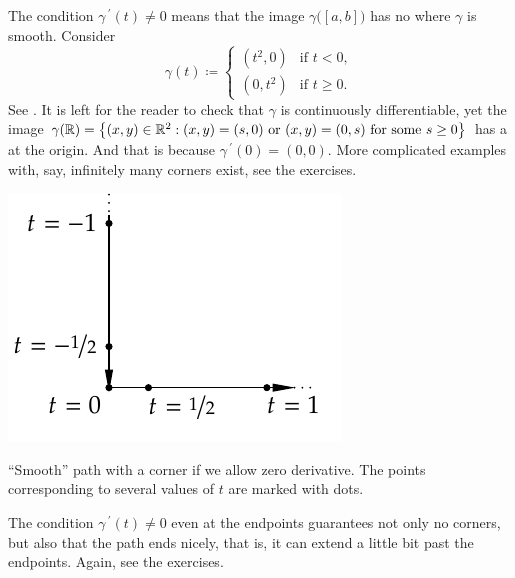 \begin{example}
The condition $\gamma^{\:\prime}(t) \not= 0$ means that the image
$\gamma\bigl([a,b]\bigr)$
has no  where $\gamma$ is smooth.
Consider 
\begin{equation*}
\gamma(t) \coloneqq
\begin{cases}
(t^2,0) & \text{if } t < 0,\\
(0,t^2) & \text{if } t \geq 0.
\end{cases}
\end{equation*}
See .
It is left for the reader to check that $\gamma$ is continuously
differentiable, yet the image $\gamma({\mathbb{R}}) = \bigl\{ (x,y) \in {\mathbb{R}}^2 : (x,y) =
(s,0) \text{ or } (x,y) = (0,s) \text{ for some } s \geq 0 \bigr\}$ has a
 at the origin.  And that is because $\gamma^{\:\prime}(0) = (0,0)$.
More complicated examples with, say, infinitely many corners exist,
see the exercises.
\begin{myfigureht}
\includegraphics{figures/cornersmoothpath}
\caption{``Smooth'' path with a corner if we allow zero derivative.  The
points corresponding to several values of
$t$ are marked with dots.\label{fig:cornersmoothpath}}
\end{myfigureht}
\end{example}

The condition $\gamma^{\:\prime}(t) \not= 0$ even at the endpoints guarantees
not only no corners, but also that the path ends nicely, that is, it can
extend a little bit past the endpoints.  Again, see the exercises.


